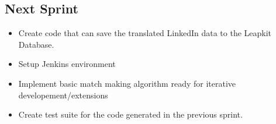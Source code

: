 \subsection{Next Sprint}

\begin{itemize}
    \item Create code that can save the translated LinkedIn data to the Leapkit Database.
    \item Setup Jenkins environment
    \item Implement basic match making algorithm ready for iterative developement/extensions
    \item Create test suite for the code generated in the previous sprint.
\end{itemize}

